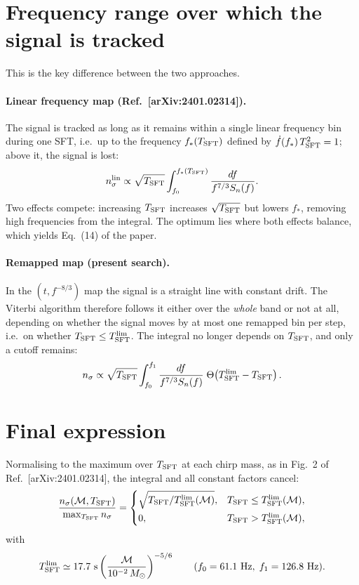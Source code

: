 \documentclass[11pt]{article}
\newcommand{\Tsft}{T_{\rm SFT}}
\newcommand{\Tlim}{T_{\rm SFT}^{\rm lim}}
\newcommand{\Mc}{\mathcal{M}}
\begin{document}
\section{Frequency range over which the signal is tracked}

This is the key difference between the two approaches.

\paragraph{Linear frequency map (Ref.~[arXiv:2401.02314]).}
The signal is tracked as long as it remains within a single linear frequency bin
during one SFT, i.e.\ up to the frequency $f_\ast(\Tsft)$ defined by
$\dot f(f_\ast)\,\Tsft^2 = 1$; above it, the signal is lost:
\begin{equation}
  n_\sigma^{\rm lin} \propto \sqrt{\Tsft} \int_{f_0}^{f_\ast(\Tsft)} \frac{df}{f^{7/3} S_n(f)} .
  \label{eq:nsigma_lin}
\end{equation}
Two effects compete: increasing $\Tsft$ increases $\sqrt{\Tsft}$ but lowers
$f_\ast$, removing high frequencies from the integral. The optimum lies where both
effects balance, which yields Eq.~(14) of the paper.

\paragraph{Remapped map (present search).}
In the $(t, f^{-8/3})$ map the signal is a straight line with constant drift. The
Viterbi algorithm therefore follows it either over the \emph{whole} band or not at
all, depending on whether the signal moves by at most one remapped bin per step,
i.e.\ on whether $\Tsft \le \Tlim$. The integral no longer depends on $\Tsft$, and
only a cutoff remains:
\begin{equation}
  n_\sigma \propto \sqrt{\Tsft} \int_{f_0}^{f_1} \frac{df}{f^{7/3} S_n(f)}\;
  \Theta\!\left(\Tlim - \Tsft\right) .
  \label{eq:nsigma_remap}
\end{equation}

\section{Final expression}

Normalising to the maximum over $\Tsft$ at each chirp mass, as in Fig.~2 of
Ref.~[arXiv:2401.02314], the integral and all constant factors cancel:
\begin{equation}
  \frac{n_\sigma(\Mc, \Tsft)}{\max_{\Tsft} n_\sigma} =
  \begin{cases}
    \sqrt{\Tsft / \Tlim(\Mc)} , & \Tsft \le \Tlim(\Mc) , \\[4pt]
    0 , & \Tsft > \Tlim(\Mc) ,
  \end{cases}
  \label{eq:nsigma_norm}
\end{equation}
with
\begin{equation}
  \Tlim \simeq 17.7~{\rm s} \left(\frac{\Mc}{10^{-2}\,M_\odot}\right)^{-5/6}
  \qquad (f_0 = 61.1~{\rm Hz},\; f_1 = 126.8~{\rm Hz}) .
  \label{eq:tlim}
\end{equation}
\end{document}
